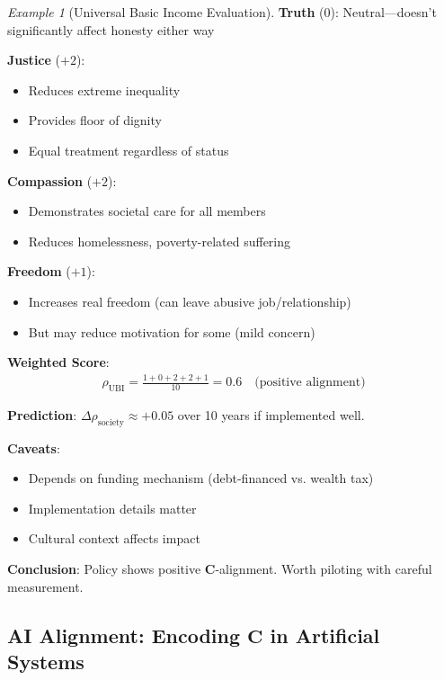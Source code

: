 \documentclass[11pt,a4paper]{article}
\theoremstyle{definition}
\theoremstyle{remark}
\newtheorem{example}{Example}[section]
\begin{document}
\begin{enumerate}
\begin{example}[Universal Basic Income Evaluation]
\textbf{Truth} (\(0\)): Neutral—doesn't significantly affect honesty either way

\textbf{Justice} (\(+2\)): 
\begin{itemize}
    \item Reduces extreme inequality
    \item Provides floor of dignity
    \item Equal treatment regardless of status
\end{itemize}

\textbf{Compassion} (\(+2\)):
\begin{itemize}
    \item Demonstrates societal care for all members
    \item Reduces homelessness, poverty-related suffering
\end{itemize}

\textbf{Freedom} (\(+1\)):
\begin{itemize}
    \item Increases real freedom (can leave abusive job/relationship)
    \item But may reduce motivation for some (mild concern)
\end{itemize}

\textbf{Weighted Score}:
\begin{align}
\rho_{\text{UBI}} = \frac{1 + 0 + 2 + 2 + 1}{10} = 0.6 \quad \text{(positive alignment)}
\end{align}

\textbf{Prediction}: \(\Delta \rho_{\text{society}} \approx +0.05\) over 10 years if implemented well.

\textbf{Caveats}:
\begin{itemize}
    \item Depends on funding mechanism (debt-financed vs. wealth tax)
    \item Implementation details matter
    \item Cultural context affects impact
\end{itemize}

\textbf{Conclusion}: Policy shows positive \(\mathbf{C}\)-alignment. Worth piloting with careful measurement.
\end{example}

\subsection{AI Alignment: Encoding \(\mathbf{C}\) in Artificial Systems}


\end{enumerate}
\end{document}
